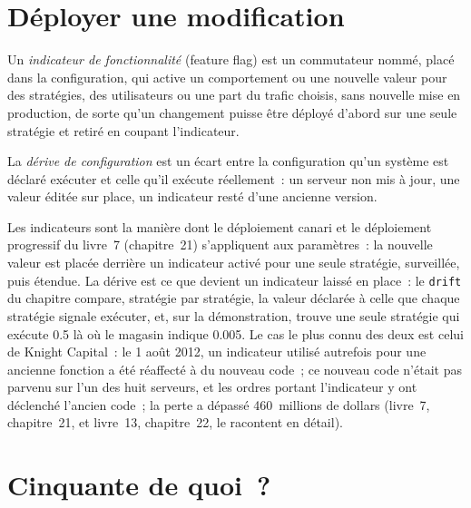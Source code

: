 \section{Déployer une modification}

\begin{definition}\label{def:pl:signal-serving-and-parameter-management:flag}
Un \emph{indicateur de fonctionnalité} (feature flag) est un commutateur nommé, placé dans la configuration, qui active un comportement ou une nouvelle valeur pour des stratégies,
des utilisateurs ou une part du trafic choisis, sans nouvelle mise en production, de sorte qu'un changement puisse être déployé d'abord sur une seule stratégie et retiré en coupant l'indicateur.
\end{definition}

\begin{definition}\label{def:pl:signal-serving-and-parameter-management:drift}
La \emph{dérive de configuration} est un écart entre la configuration qu'un système est déclaré exécuter et celle
qu'il exécute réellement~: un serveur non mis à jour, une valeur éditée sur place, un indicateur resté d'une ancienne version.
\end{definition}

Les indicateurs sont la manière dont le déploiement canari et le déploiement progressif du livre~7 (chapitre~21) s'appliquent aux paramètres~: la nouvelle valeur est placée derrière un indicateur activé
pour une seule stratégie, surveillée, puis étendue. La dérive est ce que devient un indicateur laissé en place~: le \texttt{drift} du chapitre compare, stratégie par
stratégie, la valeur déclarée à celle que chaque stratégie signale exécuter, et, sur la démonstration, trouve une seule stratégie qui exécute 0.5
là où le magasin indique 0.005. Le cas le plus connu des deux est celui de Knight Capital~: le 1 août 2012, un indicateur utilisé autrefois pour une ancienne fonction a été
réaffecté à du nouveau code~; ce nouveau code n'était pas parvenu sur l'un des huit serveurs, et les ordres portant l'indicateur y ont déclenché l'ancien code~; la
perte a dépassé 460~millions de dollars (livre~7, chapitre~21, et livre~13, chapitre~22, le racontent en détail).

\section{Cinquante de quoi~?}

